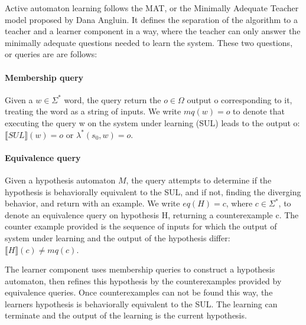 Active automaton learning follows the MAT, or the Minimally Adequate Teacher model proposed by Dana Angluin\cite{ANGLUIN198787}. It defines the separation of the algorithm to a teacher and a learner component in a way, where the teacher can only answer the minimally adequate questions needed to learn the system. These two questions, or queries are are follows:


\paragraph{Membership query} Given a $w\in\Sigma^{*}$ word, the query return the $o\in \Omega$ output o corresponding to it, treating the word as a string of inputs. We write $mq(w) = o$ to denote that executing the query w on the system under learning (SUL) leads to the output o: $\llbracket SUL \rrbracket(w) = o$ or $\lambda^*(s_0, w) = o$.

\paragraph{Equivalence query} Given a hypothesis automaton $M$, the query attempts to determine if the hypothesis is behaviorally equivalent to the SUL, and if not, finding the diverging behavior, and return with an example. We write $eq(H) = c$, where $c\in\Sigma^*$, to denote an equivalence query on hypothesis H, returning a counterexample c. The counter example provided is the sequence of inputs for which the output of system under learning and the output of the hypothesis differ: $ \llbracket H\rrbracket(c) \neq mq(c)$.

\noindent The learner component uses membership queries to construct a hypothesis automaton, then refines this hypothesis by the counterexamples provided by equivalence queries. Once counterexamples can not be found this way, the learners hypothesis is behaviorally equivalent to the SUL. The learning can terminate and the output of the learning is the current hypothesis.

